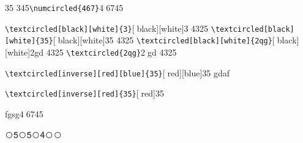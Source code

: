 \documentclass{article}
\begin{document}
\color{red}
35 345\verb|\numcircled{467}|\textcircled{467}45

 \verb|\textcircled[black][white]{3}|\textcircled[black][white]{3} 4325
   \verb|\textcircled[black][white]{35}|\textcircled[black][white]{35} 4325
  \verb|\textcircled[black][white]{2qg}|\textcircled[black][white]{2gd} 4325
    \verb|\textcircled{2qg}|\textcircled{2gd} 4325
 
  \verb|\textcircled[inverse][red][blue]{35}|\textcircled[red][blue]{35} gdaf
  
   \verb|\textcircled[inverse][red]{35}|\textcircled[red]{35}

fgsg\textcircled{467}45
   
\newcommand{\wcnt}{\textcircled{\themycnt}}

\wcnt5\wcnt5\wcnt4\wcnt\wcnt
\end{document}
